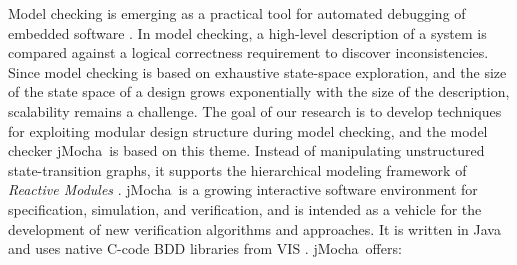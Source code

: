 \documentclass[10pt,twocolumn]{article}
\def\jmocha{{\small\sc jMocha}}
\def\cmocha{{\small\sc cMocha}}
\def\mocha{{\small\sc Mocha}}
\begin{document}
Model checking is emerging as a practical tool for automated debugging
of embedded software 
\cite{COP99,spin,Bandera}.
In model checking, a high-level description of a 
system is compared against a logical correctness requirement to 
discover inconsistencies.
Since model checking is based on exhaustive state-space exploration, and
the size of the state space of a design grows exponentially with the
size of the description,  scalability remains a challenge.
The goal of our research is to  develop techniques for exploiting
modular design structure during model checking, and
the model checker \jmocha\ is based on this theme.
Instead of manipulating unstructured state-transition graphs,
it supports the hierarchical modeling framework of {\em Reactive Modules}
\cite{Modules}. 
%
%
\jmocha\ is a growing interactive software environment for specification,
simulation, and verification, and is intended as a vehicle for the development 
of new verification algorithms and approaches. It is written in Java and uses 
native C-code BDD libraries from VIS \cite{VIS96}. \jmocha\ offers: 
%
\end{document}
